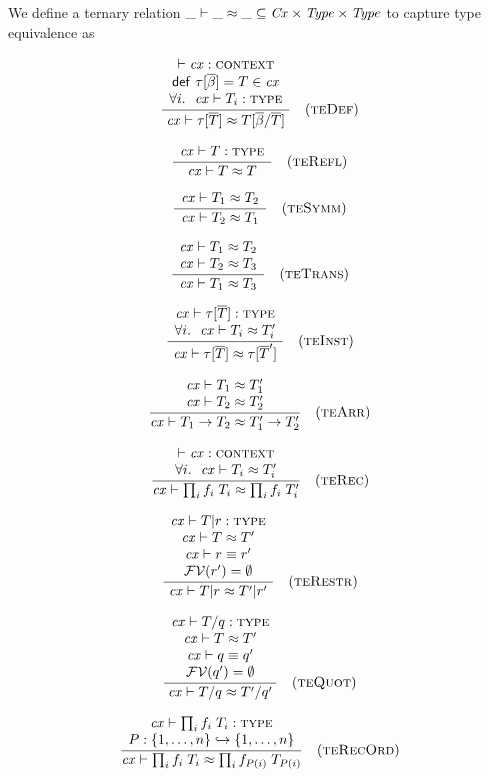 We define a ternary relation $\ternrel{\teqY}{\Cx}{\Typ}{\Typ}$ to capture
type equivalence as

\[
\rruleIII
 {\cxwfO}
 {\tdefO\in\cx}
 {\FORALL{i}{\istyO{\typ_i}}}
 {\teqO{\tinstO}{\tsbslash{\typ}{\tvarS}{\typS}}}
 {\Rtedef}
\]

\[
\rruleI
 {\istyO{\typ}}
 {\teqO{\typ}{\typ}}
 {\Rterefl}
\]


\[
\rruleI
 {\teqO{\typ_1}{\typ_2}}
 {\teqO{\typ_2}{\typ_1}}
 {\Rtesymm}
\]

\[
\rruleII
 {\teqO{\typ_1}{\typ_2}}
 {\teqO{\typ_2}{\typ_3}}
 {\teqO{\typ_1}{\typ_3}}
 {\Rtetrans}
\]


\[
\rruleII
 {\istyO{\tinstO}}
 {\FORALL{i}{\teqO{\typ_i}{\typ_i'}}}
 {\teqO{\tinstO}{\tinst{\tnam}{\typS'}}}
 {\Rteinst}
\]

\[
\rruleII
 {\teqO{\typ_1}{\typ_1'}}
 {\teqO{\typ_2}{\typ_2'}}
 {\teqO{\tarr{\typ_1}{\typ_2}}{\tarr{\typ_1'}{\typ_2'}}}
 {\Rtearr}
\]

\[
\rruleII
 {\cxwfO}
 {\FORALL{i}{\teqO{\typ_i}{\typ_i'}}}
 {\teqO{\trecO}{\trec{i}{\fnam_i}{\typ_i'}}}
 {\Rterec}
\]


\[
\rruleIV
 {\istyO{\tsubO}}
 {\teqO{\typ}{\typ'}}
 {\theoO{\eq{\tspred}{\tspred'}}}
 {\efvar{\tspred'}=\emptyset}
 {\teqO{\tsubO}{\tsub{\typ'}{\tspred'}}}
 {\Rterestr}
\]

\[
\rruleIV
 {\istyO{\tquotO}}
 {\teqO{\typ}{\typ'}}
 {\theoO{\eq{\tqpred}{\tqpred'}}}
 {\efvar{\tqpred'}=\emptyset}
 {\teqO{\tquotO}{\tquot{\typ'}{\tqpred'}}}
 {\Rtequot}
\]

\[
\rruleII
 {\istyO{\trecO}}
 {\funcinj{\perm}{\setFT{1}{n}}{\setFT{1}{n}}}
 {\teqO{\trecO}{\trec{i}{\fnam_{\perm(i)}}{\typ_{\perm(i)}}}}
 {\Rterecord}
\]



